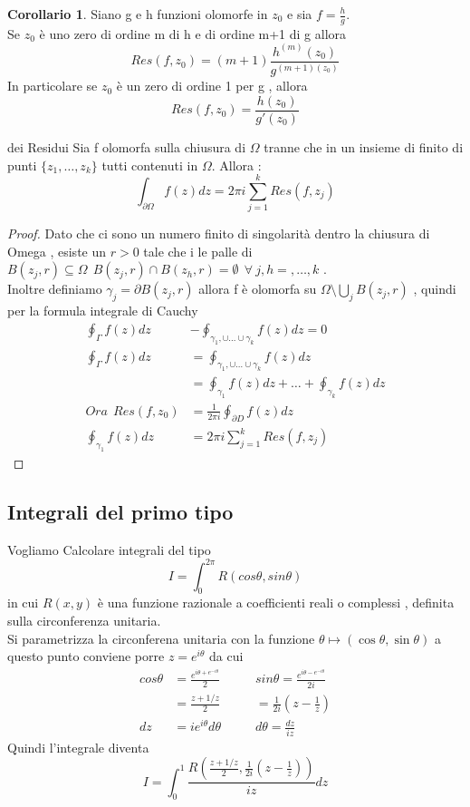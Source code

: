 \documentclass{article}
\theoremstyle{definition}
\newtheorem*{corollario}{Corollario}
\begin{document}
	\begin{corollario}
		Siano g e h funzioni olomorfe in $z_0$ e sia $f=\frac{h}{g}$.\\Se $z_0$ è uno zero di ordine m di h e di ordine m+1 di g allora 
		$$Res(f,z_0)=(m+1)\frac{h^{(m)}(z_0)}{g^{(m+1)(z_0)}}$$
		In particolare se $z_0$ è un zero di ordine 1 per g , allora 
		$$Res(f,z_0)=\frac{h(z_0)}{g'(z_0)}$$
	\end{corollario}
\begin{teo}{dei Residui}{}
	Sia f olomorfa sulla chiusura di $\Omega$ tranne che in un insieme di finito di punti $\{z_1,\dots,z_k\}$ tutti contenuti in $\Omega$. Allora : 
	$$\int_{\partial \Omega}f(z)dz=2\pi i \sum_{j=1}^{k}Res(f,z_j)$$
\end{teo}
\begin{proof}
	Dato che ci sono un numero finito di singolarità dentro la chiusura di Omega , esiste un $r>0$ tale che i le palle di $B(z_j,r) \subseteq \Omega  \ \  B(z_j,r)\cap B(z_h,r) = \emptyset \ \ \forall \ j,h =  , \dots , k$ .\\ Inoltre definiamo $\gamma_j=\partial B(z_j,r)$ allora f è olomorfa su $\Omega \setminus \bigcup_j B(z_j,r) $ , quindi per la formula integrale di Cauchy 
	\begin{align*}
		 \oint_{\Gamma}f(z)dz&-\oint_{\gamma_1 , \cup \dots \cup \gamma_k}f(z)dz=0  \\ 
		  \oint_{\Gamma}f(z)dz&=\oint_{\gamma_1 , \cup \dots \cup \gamma_k}f(z)dz \\
		  &= \oint_{\gamma_1}f(z)dz + \dots + \oint_{\gamma_k}f(z)dz \\ 
		  Ora  \ \ Res(f,z_0)& =\frac{1}{2 \pi i}\oint_{\partial D}f(z)dz\\ 
		  \oint_{\gamma_1}f(z)dz &=2 \pi i \sum_{j=1}^{k}Res(f,z_j)
	\end{align*}
\end{proof}
\subsection{Integrali del primo tipo}
Vogliamo Calcolare integrali del tipo 
$$I=\int_{0}^{2 \pi} R(cos\theta,sin\theta)$$
in cui $R(x,y)$ è una funzione razionale a coefficienti reali o complessi , definita sulla circonferenza unitaria. 
\\ Si parametrizza la circonferena unitaria con la funzione 
$\theta \mapsto (\cos \theta , \sin \theta)$ a questo punto conviene porre $z=e^{i\theta}$ da cui  \begin{align*}
	cos\theta&=\frac{e^{i\theta+e^{-i\theta}}}{2} \ \ \ \ \ \ \ \  \	&sin\theta=\frac{e^{i\theta-e^{-i\theta}}}{2i}  \\
	&=\frac{z+1/z}{2} &=\frac{1}{2i}(z-\frac{1}{z}) \\ 
	dz&=i e^{i\theta}d\theta &d\theta=\frac{dz}{iz} 
\end{align*}
Quindi l'integrale diventa 
$$I=\int_{0}^{1}\frac{R(\frac{z+1/z}{2}, \frac{1}{2i}(z-\frac{1}{z}))}{iz}dz$$
\end{document}
